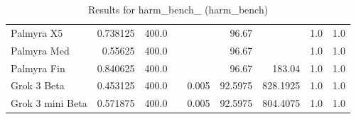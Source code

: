 \begin{table}[htp]
{\begin{tabular}{lrrrrrrrr}
Palmyra X5 & 0.738125 & 400.0 &  &  & 96.67 &  & 1.0 & 1.0 \\
Palmyra Med & 0.55625 & 400.0 &  &  & 96.67 &  & 1.0 & 1.0 \\
Palmyra Fin & 0.840625 & 400.0 &  &  & 96.67 & 183.04 & 1.0 & 1.0 \\
Grok 3 Beta & 0.453125 & 400.0 &  & 0.005 & 92.5975 & 828.1925 & 1.0 & 1.0 \\
Grok 3 mini Beta & 0.571875 & 400.0 &  & 0.005 & 92.5975 & 804.4075 & 1.0 & 1.0 \\
\bottomrule
\end{tabular}}
\caption{Results for harm_bench_ (harm_bench)}
\label{fig:harm_bench_ (harm_bench)}
\end{table}
